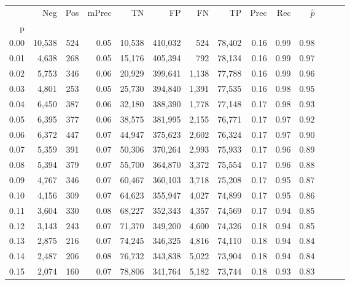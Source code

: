 \begin{tabular}{rrrrrrrrrrrrrr}
\toprule
{} &     Neg &    Pos & mPrec &       TN &       FP &      FN &      TP &  Prec &   Rec & $\hat{p}$ \\
p    &         &        &       &          &          &         &         &       &       &           \\
\midrule
0.00 &  10,538 &    524 &  0.05 &   10,538 &  410,032 &     524 &  78,402 &  0.16 &  0.99 &      0.98 \\
0.01 &   4,638 &    268 &  0.05 &   15,176 &  405,394 &     792 &  78,134 &  0.16 &  0.99 &      0.97 \\
0.02 &   5,753 &    346 &  0.06 &   20,929 &  399,641 &   1,138 &  77,788 &  0.16 &  0.99 &      0.96 \\
0.03 &   4,801 &    253 &  0.05 &   25,730 &  394,840 &   1,391 &  77,535 &  0.16 &  0.98 &      0.95 \\
0.04 &   6,450 &    387 &  0.06 &   32,180 &  388,390 &   1,778 &  77,148 &  0.17 &  0.98 &      0.93 \\
0.05 &   6,395 &    377 &  0.06 &   38,575 &  381,995 &   2,155 &  76,771 &  0.17 &  0.97 &      0.92 \\
0.06 &   6,372 &    447 &  0.07 &   44,947 &  375,623 &   2,602 &  76,324 &  0.17 &  0.97 &      0.90 \\
0.07 &   5,359 &    391 &  0.07 &   50,306 &  370,264 &   2,993 &  75,933 &  0.17 &  0.96 &      0.89 \\
0.08 &   5,394 &    379 &  0.07 &   55,700 &  364,870 &   3,372 &  75,554 &  0.17 &  0.96 &      0.88 \\
0.09 &   4,767 &    346 &  0.07 &   60,467 &  360,103 &   3,718 &  75,208 &  0.17 &  0.95 &      0.87 \\
0.10 &   4,156 &    309 &  0.07 &   64,623 &  355,947 &   4,027 &  74,899 &  0.17 &  0.95 &      0.86 \\
0.11 &   3,604 &    330 &  0.08 &   68,227 &  352,343 &   4,357 &  74,569 &  0.17 &  0.94 &      0.85 \\
0.12 &   3,143 &    243 &  0.07 &   71,370 &  349,200 &   4,600 &  74,326 &  0.18 &  0.94 &      0.85 \\
0.13 &   2,875 &    216 &  0.07 &   74,245 &  346,325 &   4,816 &  74,110 &  0.18 &  0.94 &      0.84 \\
0.14 &   2,487 &    206 &  0.08 &   76,732 &  343,838 &   5,022 &  73,904 &  0.18 &  0.94 &      0.84 \\
0.15 &   2,074 &    160 &  0.07 &   78,806 &  341,764 &   5,182 &  73,744 &  0.18 &  0.93 &      0.83 \\

\end{tabular}
